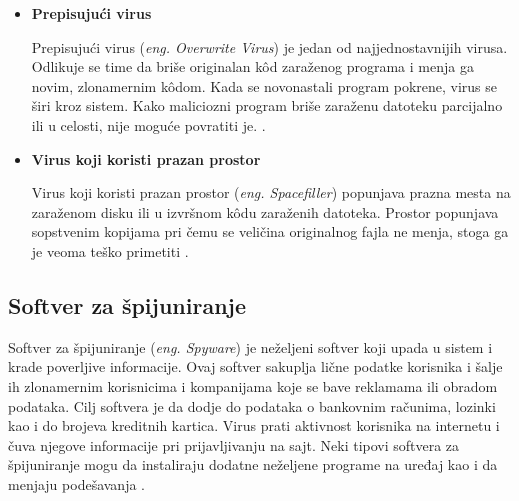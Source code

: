 \documentclass[a4paper]{article}
\begin{document}
\begin{itemize}
\item \textbf{Prepisujući virus}

Prepisujući virus (\textit{eng. Overwrite Virus}) je jedan od najjednostavnijih virusa. Odlikuje se time da briše originalan kôd zaraženog programa i menja ga novim, zlonamernim kôdom. Kada se novonastali program pokrene, virus se širi kroz sistem. Kako maliciozni program briše zaraženu datoteku parcijalno ili u celosti, nije moguće povratiti je. \cite{overwriting_virus}.

\item \textbf{Virus koji koristi prazan prostor} 

Virus koji koristi prazan prostor (\textit{eng. Spacefiller})  popunjava prazna mesta na zaraženom disku ili u izvršnom kôdu zaraženih datoteka. Prostor popunjava sopstvenim kopijama pri čemu se veličina originalnog fajla ne menja, stoga ga je veoma teško primetiti \cite{spacefiller_virus}.

\end{itemize}


\subsection{Softver za špijuniranje}
\label{spyware}
Softver za špijuniranje (\textit{eng. Spyware}) je neželjeni softver koji upada u sistem i krade poverljive informacije. Ovaj softver sakuplja lične podatke korisnika i šalje ih zlonamernim korisnicima i kompanijama koje se bave reklamama ili obradom podataka. Cilj softvera je da dodje do podataka o bankovnim računima, lozinki kao i do brojeva kreditnih kartica.
Virus prati aktivnost korisnika na internetu i čuva njegove informacije pri prijavljivanju na sajt. Neki tipovi softvera za špijuniranje mogu da instaliraju dodatne neželjene programe na uređaj kao i da menjaju podešavanja \cite{spyware}.
\end{document}
